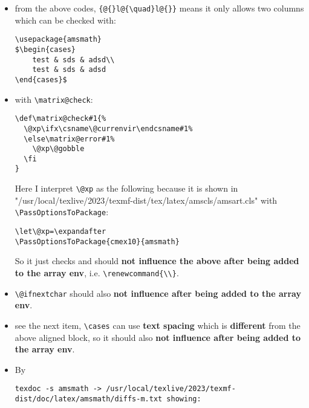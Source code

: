\documentclass{article}
\begin{document}
\begin{enumerate}
          \begin{itemize}
              \item from the above codes, \verb|{@{}l@{\quad}l@{}}| means it only allows two columns which can be checked with:
                    \begin{verbatim}
\usepackage{amsmath}
$\begin{cases}
    test & sds & adsd\\
    test & sds & adsd
\end{cases}$
                    \end{verbatim}
              \item with \verb|\matrix@check|:
                    \begin{verbatim}
\def\matrix@check#1{%
  \@xp\ifx\csname\@currenvir\endcsname#1%
  \else\matrix@error#1%
    \@xp\@gobble
  \fi
}
                    \end{verbatim}
                    Here I interpret \verb|\@xp| as the following because it is shown in "/usr/local/texlive/2023/texmf-dist/tex/latex/amscls/amsart.cls" with \verb|\PassOptionsToPackage|:
                    \begin{verbatim}
\let\@xp=\expandafter
\PassOptionsToPackage{cmex10}{amsmath}
                    \end{verbatim}
                    So it just checks and should  \textbf{not influence the above after being added to the array env}, i.e. \verb|\renewcommand{\\}|.
              \item \verb|\@ifnextchar| should also \textbf{not influence after being added to the array env}.
              \item see the next item, \verb|\cases| can use \textbf{text spacing} which is \textbf{different} from the above aligned block, so it should also \textbf{not influence after being added to the array env}.
                    \hfuzz=1000pt
              \item By
                    \begin{lstlisting}
texdoc -s amsmath -> /usr/local/texlive/2023/texmf-dist/doc/latex/amsmath/diffs-m.txt showing:

\end{lstlisting}
\end{itemize}
\end{enumerate}
\end{document}
